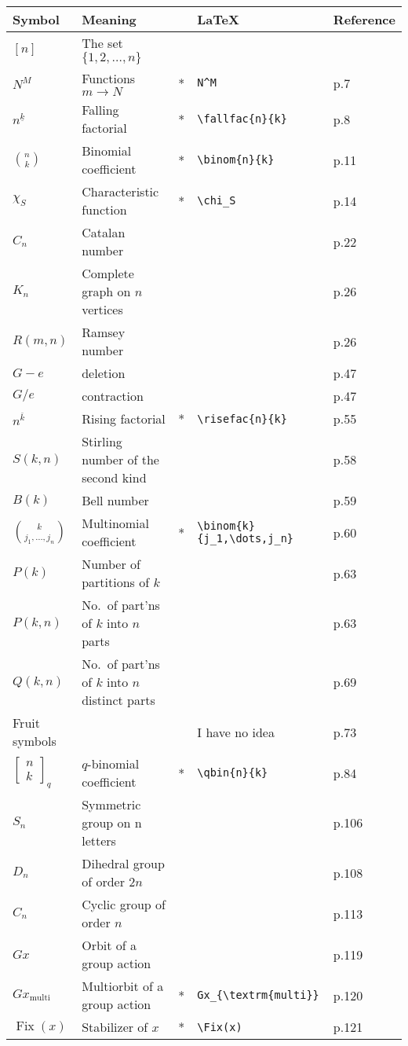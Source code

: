 \documentclass{amsart}
\newcommand{\fallfac}[2]{{#1}^{\underline{#2}}}
\newcommand{\risefac}[2]{{#1}^{\overline{#2}}}
\newcommand{\qbin}[2]{\begin{bmatrix}{#1}\\ {#2}\end{bmatrix}_q}
\DeclareMathOperator{\Fix}{Fix}
\begin{document}
\def\arraystretch{1.3}
\begin{tabular}{lllll}
\bf Symbol & \bf Meaning && \bf LaTeX & \bf Reference\\ \hline
$[n]$ & The set $\{1,2,\dots,n\}$ \\
$N^M$ & Functions $m\to N$ &*& \verb+N^M+ & p.7\\
$\fallfac{n}{k}$ & Falling factorial &*& \verb+\fallfac{n}{k}+ & p.8\\
$\binom{n}{k}$ & Binomial coefficient &*& \verb+\binom{n}{k}+ & p.11\\
$\chi_S$ & Characteristic function &*& \verb+\chi_S+ & p.14\\
$C_n$ & Catalan number &&& p.22\\
$K_n$ & Complete graph on $n$ vertices &&& p.26\\
$R(m,n)$ & Ramsey number &&& p.26\\
$G-e$ & deletion &&& p.47\\
$G/e$ & contraction &&& p.47\\
$\risefac{n}{k}$ & Rising factorial &*& \verb+\risefac{n}{k}+ & p.55 \\
$S(k,n)$ & Stirling number of the second kind &&& p.58\\
$B(k)$ & Bell number &&& p.59\\
$\binom{k}{j_1,\dots,j_n}$ & Multinomial coefficient &*& \verb+\binom{k}{j_1,\dots,j_n}+ & p.60\\
$P(k)$ & Number of partitions of $k$ &&& p.63\\
$P(k,n)$ & No.\ of part'ns of $k$ into $n$ parts &&& p.63\\
$Q(k,n)$ & No.\ of part'ns of $k$ into $n$ distinct parts &&& p.69\\
Fruit symbols &&& I have no idea & p.73\\
$\qbin{n}{k}$ & $q$-binomial coefficient &*& \verb+\qbin{n}{k}+ & p.84\\
$S_n$ & Symmetric group on n letters &&& p.106\\
$D_n$ & Dihedral group of order $2n$ &&& p.108\\
$C_n$ & Cyclic group of order $n$ &&& p.113\\
$Gx$ & Orbit of a group action &&& p.119\\
$Gx_{\textrm{multi}}$ & Multiorbit of a group action &*& \verb+Gx_{\textrm{multi}}+ & p.120\\
$\Fix(x)$ & Stabilizer of $x$ &*& \verb+\Fix(x)+ & p.121\\
\end{tabular}
\end{document}
